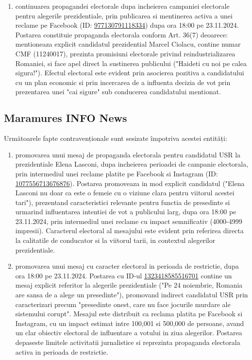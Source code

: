 \documentclass[a4paper,12pt]{article}
\begin{document}
\begin{enumerate}[leftmargin=*, label=\arabic*.)]
    \item continuarea propagandei electorale dupa incheierea campaniei electorale pentru alegerile prezidentiale, prin publicarea si mentinerea activa a unei reclame pe Facebook (ID: \href{https://www.facebook.com/ads/library/?id=977130791118334}{977130791118334}) dupa ora 18:00 pe 23.11.2024. Postarea constituie propaganda electorala conform Art. 36(7) deoarece: mentioneaza explicit candidatul prezidential Marcel Ciolacu, contine numar CMF (11240017), prezinta promisiuni electorale privind reindustrializarea Romaniei, si face apel direct la sustinerea publicului ("Haideti cu noi pe calea sigura!"). Efectul electoral este evident prin asocierea pozitiva a candidatului cu un plan economic si prin incercarea de a influenta decizia de vot prin prezentarea unei "cai sigure" sub conducerea candidatului mentionat.
\end{enumerate}

\vspace{0.5cm}

\subsection{Maramures INFO News}
Următoarele fapte contravenționale sunt sesizate împotriva acestei entități:

\begin{enumerate}[leftmargin=*, label=\arabic*.)]
    \item promovarea unui mesaj de propaganda electorala pentru candidatul USR la prezidentiale Elena Lasconi, dupa incheierea perioadei de campanie electorala, prin intermediul unei reclame platite pe Facebook si Instagram (ID: \href{https://www.facebook.com/ads/library/?id=1077556713676876}{1077556713676876}). Postarea promoveaza in mod explicit candidatul ("Elena Lasconi nu doar ca este o femeie cu o viziune clara pentru viitorul acestei tari"), prezentand caracteristici relevante pentru functia de presedinte si urmarind influentarea intentiei de vot a publicului larg, dupa ora 18:00 pe 23.11.2024, prin intermediul unei reclame cu impact semnificativ (4000-4999 impresii). Caracterul electoral al mesajului este evident prin referirea directa la calitatile de conducator si la viitorul tarii, in contextul alegerilor prezidentiale.
    \item promovarea unui mesaj cu caracter electoral in perioada de restrictie, dupa ora 18:00 pe 23.11.2024. Postarea cu ID-ul \href{https://www.facebook.com/ads/library/?id=1323418585516701}{1323418585516701} contine un mesaj explicit referitor la alegerile prezidentiale ("Pe 24 noiembrie, Romania are sansa de a alege un presedinte"), promovand indirect candidatul USR prin caracterizari precum "presedinte onest, care nu face jocurile murdare ale sistemului corupt". Mesajul este distribuit ca reclama platita pe Facebook si Instagram, cu un impact estimat intre 100,001 si 500,000 de persoane, avand un clar obiectiv electoral de influentare a votului in ziua alegerilor. Postarea depaseste limitele activitatii jurnalistice si reprezinta propaganda electorala activa in perioada de restrictie.
\end{enumerate}
\end{document}
